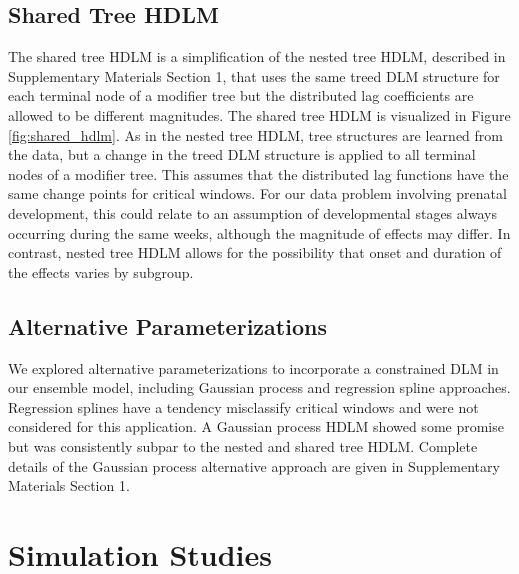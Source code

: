 \documentclass[12pt]{article}
\begin{document}
\subsection{Shared Tree HDLM}\label{sec:shared_tree_hdlm}

The shared tree HDLM is a simplification of the nested tree HDLM, described in Supplementary Materials Section 1, that uses the same treed DLM structure for each terminal node of a modifier tree but the distributed lag coefficients are allowed to be different magnitudes. The shared tree HDLM is visualized in Figure \ref{fig:shared_hdlm}. As in the nested tree HDLM, tree structures are learned from the data, but a change in the treed DLM structure is applied to all terminal nodes of a modifier tree. This assumes that the distributed lag functions have the same change points for critical windows. For our data problem involving prenatal development, this could relate to an assumption of developmental stages always occurring during the same weeks, although the magnitude of effects may differ. In contrast, nested tree HDLM allows for the possibility that onset and duration of the effects varies by subgroup.


\subsection{Alternative Parameterizations}\label{sec:gp_hdlm}
We explored alternative parameterizations to incorporate a constrained DLM in our ensemble model, including Gaussian process and regression spline approaches. Regression splines have a tendency misclassify critical windows and were not considered for this application. A Gaussian process HDLM showed some promise but was consistently subpar to the nested and shared tree HDLM. Complete details of the Gaussian process alternative approach are given in Supplementary Materials Section 1.







\section{Simulation Studies}\label{sec:sim}
\end{document}
